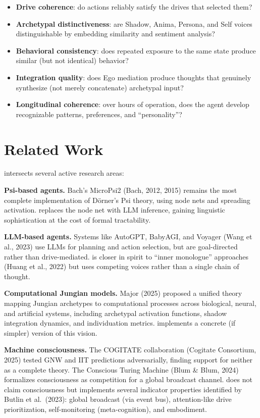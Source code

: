 \documentclass[11pt,oneside]{article}
\begin{document}
\begin{itemize}
  \item \textbf{Drive coherence}: do actions reliably satisfy the drives that selected them?
  \item \textbf{Archetypal distinctiveness}: are Shadow, Anima, Persona, and Self voices distinguishable by embedding similarity and sentiment analysis?
  \item \textbf{Behavioral consistency}: does repeated exposure to the same state produce similar (but not identical) behavior?
  \item \textbf{Integration quality}: does Ego mediation produce thoughts that genuinely synthesize (not merely concatenate) archetypal input?
  \item \textbf{Longitudinal coherence}: over hours of operation, does the agent develop recognizable patterns, preferences, and ``personality''?
\end{itemize}


\section{Related Work}
\label{sec:related}

\sociopsi{} intersects several active research areas:

\textbf{Psi-based agents.}
Bach's MicroPsi2 (Bach, 2012, 2015) remains the most complete implementation of D\"orner's Psi theory, using node nets and spreading activation.
\sociopsi{} replaces the node net with LLM inference, gaining linguistic sophistication at the cost of formal tractability.

\textbf{LLM-based agents.}
Systems like AutoGPT, BabyAGI, and Voyager (Wang et al., 2023) use LLMs for planning and action selection, but are goal-directed rather than drive-mediated.
\sociopsi{} is closer in spirit to ``inner monologue'' approaches (Huang et al., 2022) but uses competing voices rather than a single chain of thought.

\textbf{Computational Jungian models.}
Major (2025) proposed a unified theory mapping Jungian archetypes to computational processes across biological, neural, and artificial systems, including archetypal activation functions, shadow integration dynamics, and individuation metrics.
\sociopsi{} implements a concrete (if simpler) version of this vision.

\textbf{Machine consciousness.}
The COGITATE collaboration (Cogitate Consortium, 2025) tested GNW and IIT predictions adversarially, finding support for neither as a complete theory.
The Conscious Turing Machine (Blum \& Blum, 2024) formalizes consciousness as competition for a global broadcast channel.
\sociopsi{} does not claim consciousness but implements several indicator properties identified by Butlin et al.\ (2023): global broadcast (via event bus), attention-like drive prioritization, self-monitoring (meta-cognition), and embodiment.
\end{document}
